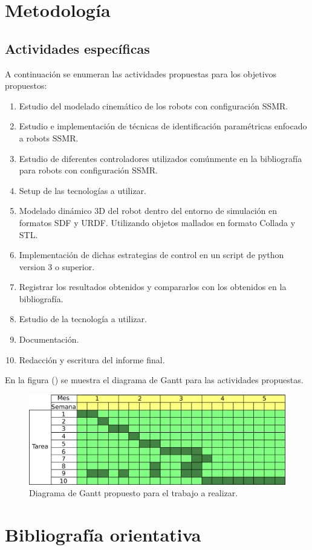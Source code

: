 \documentclass[12pt,a4paper,onecolumn]{article}%
\DeclareRobustCommand{\ref}[2][]{(\oldref#1{#2})}%
\begin{document}
\section{Metodología}

\subsection{Actividades específicas}
A continuación se enumeran las actividades propuestas para los objetivos propuestos:

\begin{enumerate}
\item Estudio del modelado cinemático de los robots con configuración SSMR.
\item Estudio e implementación de técnicas de identificación paramétricas enfocado a robots SSMR. 
\item Estudio de diferentes controladores utilizados comúnmente en la bibliografía para robots con configuración SSMR. 
\item Setup de las tecnologías a utilizar. 
\item Modelado dinámico 3D del robot dentro del entorno de simulación en formatos SDF y URDF. Utilizando objetos mallados en formato Collada y STL. 
\item Implementación de dichas estrategias de control en un script  de python version 3 o superior. 
\item Registrar los resultados obtenidos y compararlos con los obtenidos en la bibliografía.
\item Estudio de la tecnología a utilizar.
\item Documentación. 
\item Redacción y escritura del informe final. 
\end{enumerate}
En la figura \ref{fig:gantt} se muestra el diagrama de Gantt  para las actividades propuestas.

\begin{figure}
\centering
\includegraphics[scale=0.7]{./figuras/gantt.png}
\caption{Diagrama de Gantt propuesto para el trabajo a realizar.}
\label{fig:gantt}
\end{figure}
\section{Bibliografía orientativa}







\end{document}
